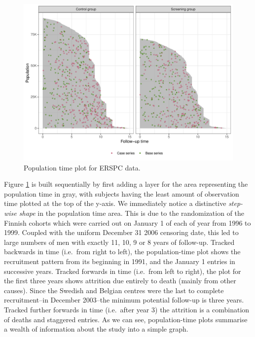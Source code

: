 \documentclass[
]{jss}
\begin{document}
\begin{CodeChunk}
\begin{figure}

{\centering \includegraphics[width=\textwidth,keepaspectratio=true]{../figures/plot-stratified-erspc-data-1} 

}

\caption[Population time plot for ERSPC data]{Population time plot for ERSPC data.}\label{fig:plot-stratified-erspc-data}
\end{figure}
\end{CodeChunk}

Figure \ref{fig:plot-stratified-erspc-data} is built sequentially by
first adding a layer for the area representing the population time in
gray, with subjects having the least amount of observation time plotted
at the top of the y-axis. We immediately notice a distinctive
\emph{step-wise shape} in the population time area. This is due to the
randomization of the Finnish cohorts which were carried out on January 1
of each of year from 1996 to 1999. Coupled with the uniform December 31
2006 censoring date, this led to large numbers of men with exactly 11,
10, 9 or 8 years of follow-up. Tracked backwards in time (i.e.~from
right to left), the population-time plot shows the recruitment pattern
from its beginning in 1991, and the January 1 entries in successive
years. Tracked forwards in time (i.e.~from left to right), the plot for
the first three years shows attrition due entirely to death (mainly from
other causes). Since the Swedish and Belgian centres were the last to
complete recruitment--in December 2003--the minimum potential follow-up
is three years. Tracked further forwards in time (i.e.~after year 3) the
attrition is a combination of deaths and staggered entries. As we can
see, population-time plots summarise a wealth of information about the
study into a simple graph.
\end{document}
